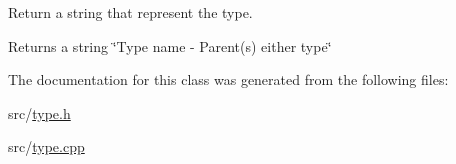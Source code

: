 Return a string that represent the type. 

\begin{DoxyReturn}{Returns}
a string \char`\"{}\+Type name -\/ Parent(s) either type\char`\"{} 
\end{DoxyReturn}


The documentation for this class was generated from the following files\+:\begin{DoxyCompactItemize}
\item 
src/\hyperlink{type_8h}{type.\+h}\item 
src/\hyperlink{type_8cpp}{type.\+cpp}\end{DoxyCompactItemize}
